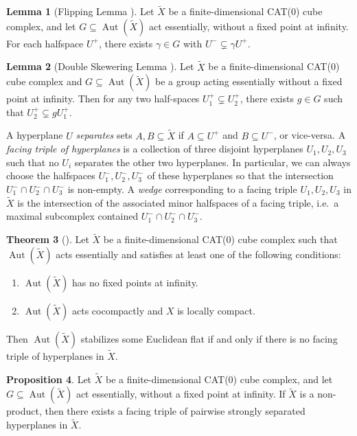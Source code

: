 \documentclass[12pt,oneside]{amsart}
\theoremstyle{definition}
\newtheorem{thm}{Theorem}[section]
\newtheorem{lem}[thm]{Lemma}
\newtheorem{prop}[thm]{Proposition}
\theoremstyle{definition}
\theoremstyle{remark}
\DeclareMathOperator{\Aut}{Aut}
\begin{document}
\begin{lem}[Flipping Lemma {\cite[Thm~4.1]{CapraceSageev2011}}] \label{lem: flipping lemma}
      Let $\widetilde X$ be a finite-dimensional CAT(0) cube complex, and let $G\subseteq \Aut(\widetilde X)$ act essentially, without a fixed point at infinity. For each halfspace $U^+$, there exists $\gamma\in G$ with $U^-\subsetneq \gamma U^+$.
\end{lem}

\begin{lem}[Double Skewering Lemma {\cite{CapraceSageev2011}}] \label{lem: double skewering lemma}
      Let $\widetilde X$ be a finite-dimensional CAT(0) cube complex and $G \subseteq \Aut(\widetilde X)$ be a group acting essentially without a fixed point at infinity. Then for any two half-spaces $U_1^+\subsetneq U_2^+$, there exists $g\in G$ such that $U_2^+\subsetneq g U_1^+$.
\end{lem}

A hyperplane $U$ \emph{separates} sets $A,B\subseteq \widetilde X$ if $A\subseteq U^+$ and $B\subseteq U^-$, or vice-versa.
A \emph{facing triple of hyperplanes} is a collection of three disjoint hyperplanes $U_1, U_2, U_3$ such that no $U_i$ separates the other two hyperplanes. In particular, we can always choose the halfspaces $U_1^-, U_2^-, U_3^-$ of these hyperplanes so that the intersection $U_1^-\cap U_2^-\cap U_3^-$ is non-empty. 
A \emph{wedge} corresponding to a facing triple $U_1, U_2, U_3$ in $\widetilde X$ is the intersection of the associated minor halfspaces of a facing triple, i.e.\ a maximal subcomplex contained $U_1^-\cap U_2^-\cap U_3^-$.

  
\begin{thm}[{\cite[Thm~7.2]{CapraceSageev2011}}] \label{thm: no facing triple} 
    Let $\widetilde X$ be a finite-dimensional CAT(0) cube complex such that $\Aut(\widetilde X)$ acts essentially and satisfies at least one of the following conditions:
    \begin{enumerate}
        \item $\Aut(\widetilde X)$ has no fixed points at infinity.
        \item $\Aut(\widetilde X)$ acts cocompactly and $X$ is locally compact.
    \end{enumerate}
    Then $\Aut(\widetilde X)$ stabilizes some Euclidean flat if and only if there is no facing triple of hyperplanes in $\widetilde X$.
\end{thm}

\begin{prop}\label{prop: strongly separated facing triple}
     Let $\widetilde X$ be a finite-dimensional CAT(0) cube complex, and let $G\subseteq \Aut(\widetilde X)$ act essentially, without a fixed point at infinity.
     If $\widetilde X$ is a non-product, then there exists a facing triple of pairwise strongly separated hyperplanes in $\widetilde X$.
\end{prop}
\end{document}

